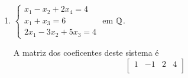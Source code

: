 \begin{exemplo}
\begin{enumerate}
\begin{solucao}
\begin{align*}
\begin{gmatrix}[b]
						\overline{0} & \overline{1} & \overline{0} & \overline{2} & \overline{1}\\
						\overline{0} & \overline{0} & \overline{1} & \overline{1} & \overline{1}\\
						\overline{0} & \overline{0} & \overline{0} & \overline{5} & \overline{9}
						\rowops
						\mult3{\times \overline{9}}
     				\end{gmatrix}\\&\leadsto\begin{gmatrix}[b]
  						\overline{1} & \overline{0} & \overline{0} & \overline{10} & \overline{2}\\
						\overline{0} & \overline{1} & \overline{0} & \overline{2} & \overline{1}\\
						\overline{0} & \overline{0} & \overline{1} & \overline{1} & \overline{1}\\
						\overline{0} & \overline{0} & \overline{0} & \overline{1} & \overline{4}
						\rowops
						\add[\overline{10}]{3}{2}
					    \add[\overline{9}]{3}{1}
					    \add[\overline{1}]{3}{0}
     				\end{gmatrix}\\&\leadsto\begin{bmatrix}
  						\overline{1} & \overline{0} & \overline{0} & \overline{0} & \overline{6}\\
						\overline{0} & \overline{1} & \overline{0} & \overline{0} & \overline{4}\\
						\overline{0} & \overline{0} & \overline{1} & \overline{0} & \overline{8}\\
						\overline{0} & \overline{0} & \overline{0} & \overline{1} & \overline{4}
     				\end{bmatrix}.
			\end{align*}
			Assim o posto de $A$ \'e $p = 4$ e a nulidade \'e 0. Logo o sistema tem uma \'unica solu\c{c}\~ao dada por
			\[
				x_1 = \overline{6}, x_2 = \overline{4}, x_3 = \overline{8}, x_4 = \overline{4}.
			\]
		\end{solucao}
		\item $\begin{cases}
			x_1 - x_2 + 2x_4 = 4\\
			x_1 + x_3 = 6\\
			2x_1 - 3x_2 + 5x_3 = 4
		\end{cases}$  em $\mathbb{Q}$.
		\begin{solucao}
			A matriz dos coeficentes deste sistema \'e
			\[
				\begin{bmatrix}
					1 & -1 & 2 & 4 \\

\end{bmatrix}\]
\end{solucao}
\end{enumerate}
\end{exemplo}
